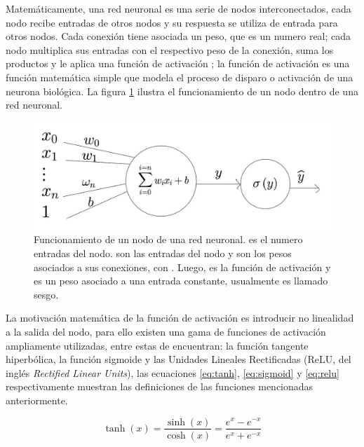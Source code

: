 Matemáticamente, una red neuronal es una serie de nodos interconectados, cada nodo recibe entradas de otros nodos y su respuesta se utiliza de entrada para otros nodos. Cada conexión tiene asociada un peso, que es un numero real; cada nodo multiplica sus entradas con el respectivo peso de la conexión, suma los productos y le aplica una función de activación \cite{Gurney1997}; la función de activación es una función matemática simple que modela el proceso de disparo o activación de una neurona biológica. La figura \ref{fig:nn-single-node} ilustra el funcionamiento de un nodo dentro de una red neuronal.

\begin{figure}[H]
    \centering
    \includegraphics[scale=0.25]{partes/ImgJoao/perceptron.jpg}
    \caption[Funcionamiento de un nodo de una red neuronal.]{
        Funcionamiento de un nodo de una red neuronal\footnotemark.  es el numero entradas del nodo.  son las entradas del nodo y  son los pesos asociados a sus conexiones, con . Luego, \jim{\sigma} es la función de activación y  es un peso asociado a una entrada constante, usualmente es llamado sesgo.
    } 
    \label{fig:nn-single-node}
\end{figure}

La motivación matemática de la función de activación es introducir no linealidad a la salida del nodo, para ello existen una gama de funciones de activación ampliamente utilizadas, entre estas de encuentran: la función tangente hiperbólica, la función sigmoide y las Unidades Lineales Rectificadas (ReLU, del inglés \textit{Rectified Linear Units}), las ecuaciones \ref{eq:tanh}, \ref{eq:sigmoid} y \ref{eq:relu} respectivamente muestran las definiciones de las funciones mencionadas anteriormente.

\begin{equation}
    \label{eq:tanh}
    \tanh(x) = \frac{\sinh(x)}{\cosh(x)} = \frac{e^x - e^{-x}}{e^x + e^{-x}}
\end{equation}

